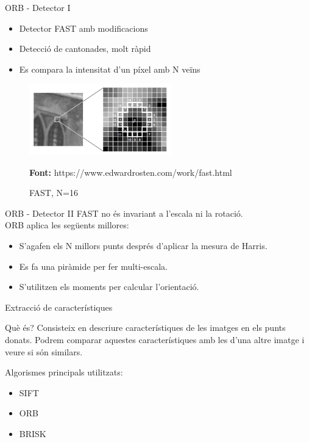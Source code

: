 \documentclass[xcolor=table, 11pt]{beamer}
\newcommand*{\captionsource}[2]{%
  \caption[{#1}]{#1}\par
  \vspace{-0.4cm}
  \tiny{\textbf{Font:} #2\par}}
\newcommand\tz{\fontsize{13}{15.6}\selectfont}
\begin{document}
	\begin{frame}{ORB - Detector I}
		\tz
		\begin{itemize}
			\item{Detector FAST\cite{Rosten:2006:MLH:2094437.2094478} amb modificacions}
			\item{Detecció de cantonades, molt ràpid}
			\item{Es compara la intensitat d'un píxel amb N veïns}
		\end{itemize}
		\begin{figure}[H]
			\centering
			\includegraphics[width=0.55\textwidth]{images/fast}
			\captionsource{FAST, N=16}{https://www.edwardrosten.com/work/fast.html}
		\end{figure}
	\end{frame}

	\begin{frame}{ORB - Detector II}
		\tz
		\alert{FAST no és invariant a l'escala ni la rotació.}\\
		\vspace{0.5cm}
		ORB aplica les següents millores:\\

		\begin{itemize}
			\item{S'agafen els N millors punts després d'aplicar la mesura de Harris.}
			\item{Es fa una piràmide per fer multi-escala.}
			\item{S'utilitzen els moments per calcular l'orientació.}
		\end{itemize}
	\end{frame}

	\begin{frame}{Extracció de característiques}
		\tz
		\begin{block}{Què és?}
			Consisteix en descriure característiques de les imatges en els punts donats. Podrem comparar aquestes característiques amb les d'una altre imatge i veure si són similars.
		\end{block}
		Algorismes principals utilitzats:
		\begin{itemize}
			\item SIFT
			\item ORB
			\item BRISK\cite{Leutenegger:2011:BBR:2355573.2356277}
		\end{itemize}
	\end{frame}
\end{document}
